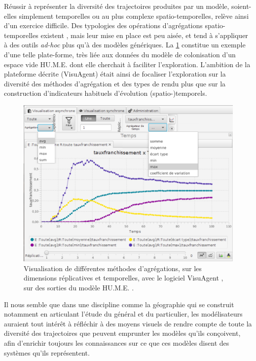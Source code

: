 \documentclass[a4paper, 12pt]{article}
\begin{document}
Réussir à représenter la diversité des trajectoires produites par un modèle, soient-elles simplement temporelles ou au plus complexe spatio-temporelles, relève ainsi d'un exercice difficile.
Des typologies des opérations d'agrégations spatio-temporelles existent \autocite{bach_review_2014}, mais leur mise en place est peu aisée, et tend à s'appliquer à des outils \textit{ad-hoc} plus qu'à des modèles génériques.
La \cref{fig:visuagent} constitue un exemple d'une telle plate-forme, très liée aux données du modèle de colonisation d'un espace vide \og HU.M.E.\fg{} dont elle cherchait à faciliter l'exploration.
L'ambition de la plateforme décrite (\textsf{VisuAgent}) était ainsi de focaliser l'exploration sur la diversité des méthodes d'agrégation et des types de rendu plus que sur la construction d'indicateurs habituels d'évolution (spatio-)temporels.

\begin{figure}[H]
	\centering
	\includegraphics[width=\linewidth]{img/visuagent_agregations.png}
	\caption{Visualisation de différentes méthodes d'agrégations, sur les dimensions réplicatives et temporelles, avec le logiciel \textsf{VisuAgent} \autocite{cura_visuagent_2014}, sur des sorties du modèle \og HU.M.E.\fg{} \autocite{lenechet:hal-02025441}.}
	\label{fig:visuagent}
\end{figure}

Il nous semble que dans une discipline comme la géographie qui se construit notamment en articulant l'étude du général et du particulier, les modélisateurs auraient tout intérêt à réfléchir à des moyens visuels de rendre compte de toute la diversité des trajectoires que peuvent emprunter les modèles qu'ils conçoivent, afin d'enrichir toujours les connaissances sur ce que ces modèles disent des systèmes qu'ils représentent.
\end{document}
